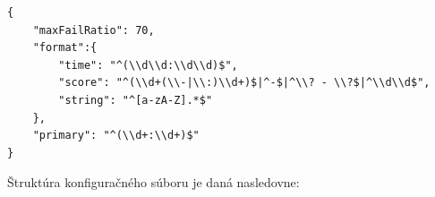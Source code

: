 \begin{lstlisting}[caption={Príklad konfiguračného súboru},captionpos=b,label={config_ex}]
{
    "maxFailRatio": 70,
    "format":{
        "time": "^(\\d\\d:\\d\\d)$",
        "score": "^(\\d+(\\-|\\:)\\d+)$|^-$|^\\? - \\?$|^\\d\\d$",
        "string": "^[a-zA-Z].*$"
    },
    "primary": "^(\\d+:\\d+)$"
}
\end{lstlisting}

\bigskip

Štruktúra konfiguračného súboru je daná nasledovne:

